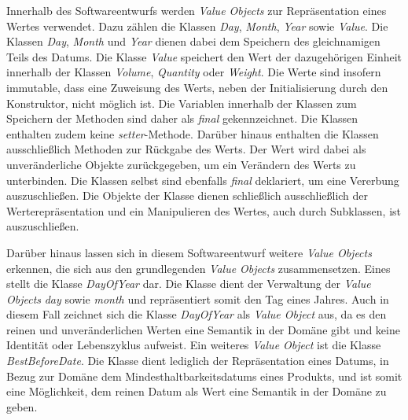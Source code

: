 \label{domaindrivendesign>valueobjects}
Innerhalb des Softwareentwurfs werden \textit{Value Objects} zur Repräsentation eines Wertes verwendet.
Dazu zählen die Klassen \textit{Day}, \textit{Month}, \textit{Year} sowie \textit{Value}.
Die Klassen \textit{Day}, \textit{Month} und \textit{Year} dienen dabei dem Speichern des gleichnamigen Teils des Datums.
Die Klasse \textit{Value} speichert den Wert der dazugehörigen Einheit innerhalb der Klassen \textit{Volume}, \textit{Quantity} oder \textit{Weight}.
Die Werte sind insofern immutable, dass eine Zuweisung des Werts, neben der Initialisierung durch den Konstruktor, nicht möglich ist.
Die Variablen innerhalb der Klassen zum Speichern der Methoden sind daher als \textit{final} gekennzeichnet.
Die Klassen enthalten zudem keine \textit{setter}-Methode.
Darüber hinaus enthalten die Klassen ausschließlich Methoden zur Rückgabe des Werts.
Der Wert wird dabei als unveränderliche Objekte zurückgegeben, um ein Verändern des Werts zu unterbinden.
Die Klassen selbst sind ebenfalls \textit{final} deklariert, um eine Vererbung auszuschließen.
Die Objekte der Klasse dienen schließlich ausschließlich der Werterepräsentation und ein Manipulieren des Wertes, auch durch Subklassen, ist auszuschließen.

Darüber hinaus lassen sich in diesem Softwareentwurf weitere \textit{Value Objects} erkennen, die sich aus den grundlegenden \textit{Value Objects} zusammensetzen.
Eines stellt die Klasse \textit{DayOfYear} dar.
Die Klasse dient der Verwaltung der \textit{Value Objects} \textit{day} sowie \textit{month} und repräsentiert somit den Tag eines Jahres.
Auch in diesem Fall zeichnet sich die Klasse \textit{DayOfYear} als \textit{Value Object} aus, da es den reinen und unveränderlichen Werten eine Semantik in der Domäne gibt und keine Identität oder Lebenszyklus aufweist.
Ein weiteres \textit{Value Object} ist die Klasse \textit{BestBeforeDate}.
Die Klasse dient lediglich der Repräsentation eines Datums, in Bezug zur Domäne dem Mindesthaltbarkeitsdatums eines Produkts, und ist somit eine Möglichkeit, dem reinen Datum als Wert eine Semantik in der Domäne zu geben.

